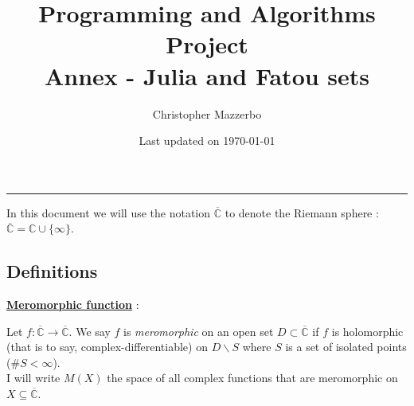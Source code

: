 \documentclass{article}
\title{Programming and Algorithms Project \\ Annex - Julia and Fatou sets}
\author{Christopher Mazzerbo}
\date{Last updated on \today}
\newcommand\C{\mathbb{C}}
\def\prop#1{\underline{\textbf{#1}}}
\begin{document}
\setcounter{section}{1}

\titlespacing{\subsubsection}{5mm}{0cm}{0cm}


\pagestyle{plain}
\maketitle
\vspace{5mm}
\hrule
\pagebreak


\pagestyle{fancy}
\fancyhf{}
\fancyhfoffset[L]{1cm} %
\fancyhfoffset[R]{1cm} %
\fancyfoot{}
\fancyfoot[C]{\thepage}

\tableofcontents
\pagebreak



In this document we will use the notation $\overline{\C}$ to denote the Riemann sphere : $\overline{\C} = \C \cup \lbrace \infty \rbrace$. \\

\subsection{Definitions}

\prop{Meromorphic function} : \\
\begin{changemargin}{1cm}{0cm}
Let $f : \overline{\C} \to \overline{\C}$. We say $f$ is \textit{meromorphic} on an open set $D \subset \overline{\C}$ if $f$ is holomorphic (that is to say, complex-differentiable) on $D \backslash S$ where $S$ is a set of isolated points ($\#S < \infty$). \\
\vspace{2mm}
I will write $M(X)$ the space of all complex functions that are meromorphic on $X \subseteq \overline{\C}$.
\end{changemargin}
\vspace{5mm}
\end{document}
